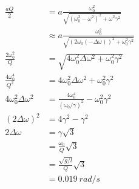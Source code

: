 \documentclass{article}
\begin{document}
\begin{enumerate}
        \begin{align*}
          \frac{a Q}{2}                & = a \frac{\omega_0^2}{\sqrt{(\omega_0^2 - \omega^2)^2 + \omega^2 \gamma^2}}               \\
                                       & \approx a \frac{\omega_0^2}{\sqrt{(2 \omega_0 (-\Delta \omega))^2 + \omega_0^2 \gamma^2}} \\
          \frac{2 \omega_0^2}{Q}       & = \sqrt{4 \omega_0^2 \Delta \omega^2 + \omega_0^2 \gamma^2}                               \\
          \frac{4 \omega_0^4}{Q^2}     & = 4 \omega_0^2 \Delta \omega^2 + \omega_0^2 \gamma^2                                      \\
          4 \omega_0^2 \Delta \omega^2 & = \frac{4 \omega_0^4}{(\omega_0 / \gamma)^2} - \omega_0^2 \gamma^2                        \\
          (2 \Delta \omega)^2          & = 4 \gamma^2 - \gamma^2                                                                   \\
          2 \Delta \omega              & = \gamma \sqrt{3}                                                                         \\
                                       & = \frac{\omega_0}{Q} \sqrt{3}                                                             \\
                                       & = \frac{\sqrt{g / l}}{Q} \sqrt{3}                                                         \\
                                       & = \qty{0.019}{rad/s}
        \end{align*}
\end{enumerate}

\subsection{}
\end{document}
